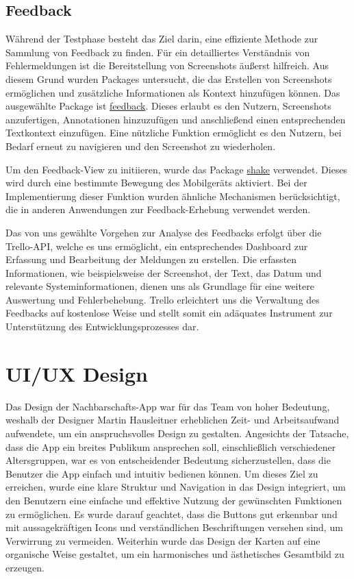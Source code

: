 \subsection{Feedback}
Während der Testphase besteht das Ziel darin, eine effiziente Methode zur Sammlung von Feedback zu finden. Für ein detailliertes Verständnis von Fehlermeldungen ist die Bereitstellung von Screenshots äußerst hilfreich. Aus diesem Grund wurden Packages untersucht, die das Erstellen von Screenshots ermöglichen und zusätzliche Informationen als Kontext hinzufügen können. Das ausgewählte Package ist \href{https://pub.dev/packages/feedback}{feedback}. Dieses erlaubt es den Nutzern, Screenshots anzufertigen, Annotationen hinzuzufügen und anschließend einen entsprechenden Textkontext einzufügen. Eine nützliche Funktion ermöglicht es den Nutzern, bei Bedarf erneut zu navigieren und den Screenshot zu wiederholen.

Um den Feedback-View zu initiieren, wurde das Package \href{https://pub.dev/packages/shake}{shake} verwendet. Dieses wird durch eine bestimmte Bewegung des Mobilgeräts aktiviert. Bei der Implementierung dieser Funktion wurden ähnliche Mechanismen berücksichtigt, die in anderen Anwendungen zur Feedback-Erhebung verwendet werden.

Das von uns gewählte Vorgehen zur Analyse des Feedbacks erfolgt über die Trello-API, welche es uns ermöglicht, ein entsprechendes Dashboard zur Erfassung und Bearbeitung der Meldungen zu erstellen. Die erfassten Informationen, wie beispielsweise der Screenshot, der Text, das Datum und relevante Systeminformationen, dienen uns als Grundlage für eine weitere Auswertung und Fehlerbehebung. Trello erleichtert uns die Verwaltung des Feedbacks auf kostenlose Weise und stellt somit ein adäquates Instrument zur Unterstützung des Entwicklungsprozesses dar.


\section{UI/UX Design}
Das Design der Nachbarschafts-App war für das Team von hoher Bedeutung, weshalb der Designer Martin Hausleitner erheblichen Zeit- und Arbeitsaufwand aufwendete, um ein anspruchsvolles Design zu gestalten. Angesichts der Tatsache, dass die App ein breites Publikum ansprechen soll, einschließlich verschiedener Altersgruppen, war es von entscheidender Bedeutung sicherzustellen, dass die Benutzer die App einfach und intuitiv bedienen können. Um dieses Ziel zu erreichen, wurde eine klare Struktur und Navigation in das Design integriert, um den Benutzern eine einfache und effektive Nutzung der gewünschten Funktionen zu ermöglichen. Es wurde darauf geachtet, dass die Buttons gut erkennbar und mit aussagekräftigen Icons und verständlichen Beschriftungen versehen sind, um Verwirrung zu vermeiden. Weiterhin wurde das Design der Karten auf eine organische Weise gestaltet, um ein harmonisches und ästhetisches Gesamtbild zu erzeugen.
